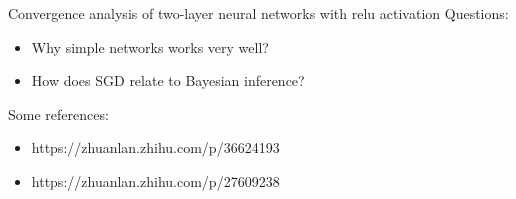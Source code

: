 
\begin{frame}{Convergence analysis of two-layer neural networks with relu activation\cite{li2017convergence}}
Questions:
\begin{itemize}
\item Why simple networks works very well?
\item How does SGD relate to Bayesian inference?
\end{itemize}
Some references:
\begin{itemize}
\item https://zhuanlan.zhihu.com/p/36624193
\item https://zhuanlan.zhihu.com/p/27609238
\end{itemize}
\end{frame}
    